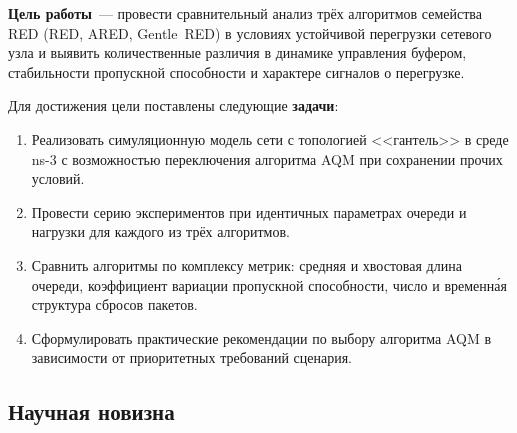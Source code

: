 \documentclass[12pt,a4paper]{article}
\begin{document}
\textbf{Цель работы}~--- провести сравнительный анализ трёх алгоритмов семейства RED (RED, ARED, Gentle~RED) в условиях устойчивой перегрузки сетевого узла и выявить количественные различия в динамике управления буфером, стабильности пропускной способности и характере сигналов о перегрузке.

Для достижения цели поставлены следующие \textbf{задачи}:
\begin{enumerate}
  \item Реализовать симуляционную модель сети с топологией <<гантель>> в среде ns-3 с возможностью переключения алгоритма AQM при сохранении прочих условий.
  \item Провести серию экспериментов при идентичных параметрах очереди и нагрузки для каждого из трёх алгоритмов.
  \item Сравнить алгоритмы по комплексу метрик: средняя и хвостовая длина очереди, коэффициент вариации пропускной способности, число и временн\'{а}я структура сбросов пакетов.
  \item Сформулировать практические рекомендации по выбору алгоритма AQM в зависимости от приоритетных требований сценария.
\end{enumerate}

\subsection{Научная новизна}
\end{document}
